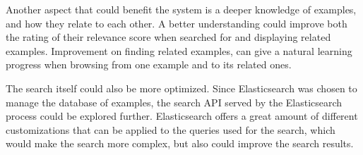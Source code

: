 Another aspect that could benefit the system is a deeper knowledge of examples, and how they relate to each other. A better understanding could improve both the rating of their relevance score when searched for and displaying related examples. Improvement on finding related examples, can give a natural learning progress when browsing from one example and to its related ones.

The search itself could also be more optimized. Since Elasticsearch was chosen to manage the database of examples, the search API served by the Elasticsearch process could be explored further. Elasticsearch offers a great amount of different customizations that can be applied to the queries used for the search, which would make the search more complex, but also could improve the search results.


\cleardoublepage